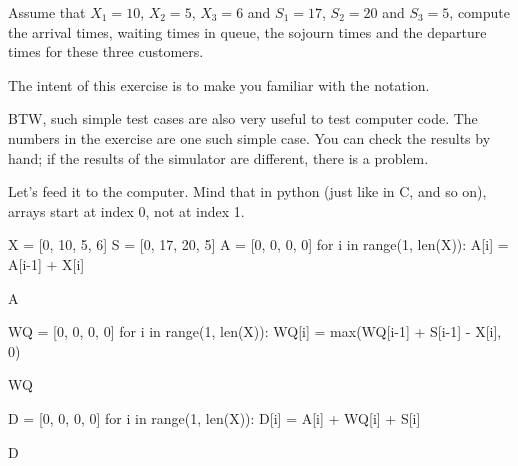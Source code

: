 \begin{exercise}
 Assume that $X_1=10$, $X_2=5$, $X_3=6$ and $S_1 = 17$,
    $S_2=20$ and $S_3=5$, compute the arrival times, waiting times in
    queue, the sojourn times and the departure times for these three
    customers.
  \begin{hint}
     The intent of this exercise is
      to make you familiar with the notation.

      BTW, such simple test cases are also very useful to test
      computer code. The numbers in the exercise are one such simple
      case. You can check the results by hand; if the results of the
      simulator are different, there is a problem.
    \end{hint}
    \begin{solution} Let's feed it to the computer. Mind that in python (just like in C, and so on), arrays start at index 0, not at index 1. 
\begin{pyconsole}
X = [0, 10, 5, 6] 
S = [0, 17, 20, 5]
A = [0, 0, 0, 0]
for i in range(1, len(X)):
    A[i] = A[i-1] + X[i]

A

WQ = [0, 0, 0, 0]
for i in range(1, len(X)):
    WQ[i] = max(WQ[i-1] + S[i-1] - X[i], 0)

WQ

D = [0, 0, 0, 0]
for i in range(1, len(X)):
    D[i] = A[i] + WQ[i] + S[i]

D
\end{pyconsole}
      
    \end{solution}
  \end{exercise}

